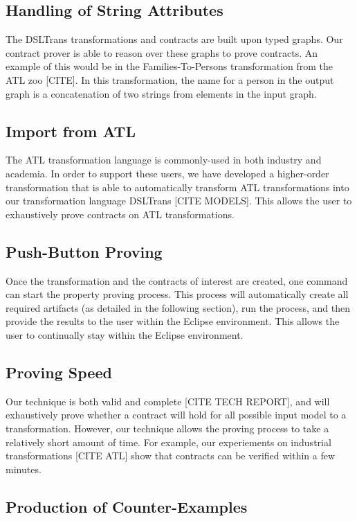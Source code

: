\subsection{Handling of String Attributes}
The DSLTrans transformations and contracts are built upon typed graphs. 
Our contract prover is able to reason over these graphs to prove contracts. An example of this would be in the Families-To-Persons transformation from the ATL zoo [CITE]. In this transformation, the name for a person in the output graph is a concatenation of two strings from elements in the input graph.


\subsection{Import from ATL}
The ATL transformation language is commonly-used in both industry and academia. In order to support these users, we have developed a higher-order transformation that is able to automatically transform ATL transformations into our transformation language DSLTrans [CITE MODELS]. This allows the user to exhaustively prove contracts on ATL transformations.

\subsection{Push-Button Proving}
Once the transformation and the contracts of interest are created, one command can start the property proving process. This process will automatically create all required artifacts (as detailed in the following section), run the process, and then provide the results to the user within the Eclipse environment. This allows the user to continually stay within the Eclipse environment.

\subsection{Proving Speed}

Our technique is both valid and complete [CITE TECH REPORT], and will exhaustively prove whether a contract will hold for all possible input model to a transformation. However, our technique allows the proving process to take a relatively short amount of time. For example, our experiements on industrial transformations [CITE ATL] show that contracts can be verified within a few minutes. 

\subsection{Production of Counter-Examples}

